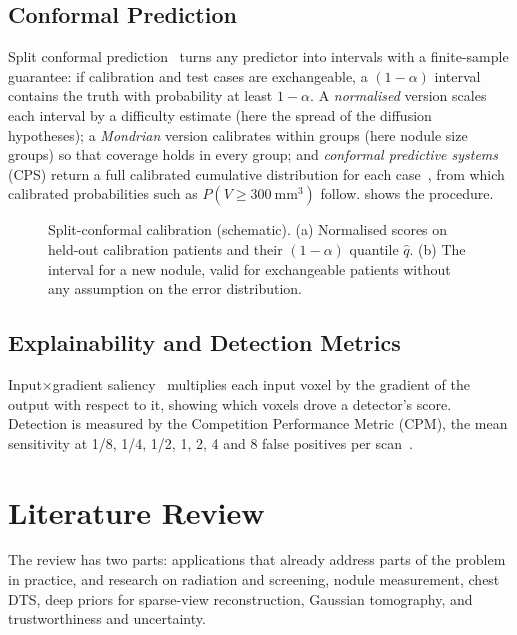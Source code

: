\subsection{Conformal Prediction}
 Split conformal prediction~\cite{vovk2022alrw,angelopoulos2023} turns any predictor into intervals with a finite-sample guarantee: if calibration and test cases are exchangeable, a $(1-\alpha)$ interval contains the truth with probability at least $1-\alpha$. A \emph{normalised} version scales each interval by a difficulty estimate (here the spread of the diffusion hypotheses); a \emph{Mondrian} version calibrates within groups (here nodule size groups) so that coverage holds in every group; and \emph{conformal predictive systems} (CPS) return a full calibrated cumulative distribution for each case~\cite{vovk2019cps,bostrom2022crepes}, from which calibrated probabilities such as $P(V\geq 300~\text{mm}^3)$ follow.  shows the procedure.

\begin{figure}[htbp]
  \centering
  \resizebox{\linewidth}{!}{}
  \caption[Split-conformal calibration]{Split-conformal calibration (schematic). (a) Normalised scores on held-out calibration patients and their $(1-\alpha)$ quantile $\hat q$. (b) The interval for a new nodule, valid for exchangeable patients without any assumption on the error distribution.}
  \label{fig:conformal}
\end{figure}

\subsection{Explainability and Detection Metrics}
 Input$\times$gradient saliency~\cite{shrikumar2017} multiplies each input voxel by the gradient of the output with respect to it, showing which voxels drove a detector's score. Detection is measured by the Competition Performance Metric (CPM), the mean sensitivity at 1/8, 1/4, 1/2, 1, 2, 4 and 8 false positives per scan~\cite{setio2017luna}.

\section{Literature Review}

The review has two parts: applications that already address parts of the problem in practice, and research on radiation and screening, nodule measurement, chest DTS, deep priors for sparse-view reconstruction, Gaussian tomography, and trustworthiness and uncertainty.

